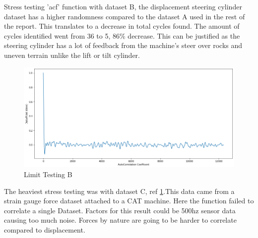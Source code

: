 Stress testing 'acf' function with dataset B, the displacement steering cylinder dataset has a higher randomness compared to the dataset A used in the rest of the report. This translates to a decrease in total cycles found. The amount of cycles identified went from 36 to 5, 86\% decrease. 
This can be justified as the steering cylinder has a lot of feedback from the machine's steer over rocks and uneven terrain unlike the lift or tilt cylinder.

\begin{figure}[ht]
\centering
\includegraphics[scale=0.40]{images/limitTestB.png}
\caption{Limit Testing B }
\label{LimitB}
\end{figure}
The heaviest stress testing was with dataset C, ref \ref{LimitB}.This data came from a strain gauge force dataset attached to a CAT machine. Here the function failed to correlate a single Dataset. Factors for this result could be 500hz sensor data causing too much noise. Forces by nature are going to be harder to correlate compared to displacement. 
